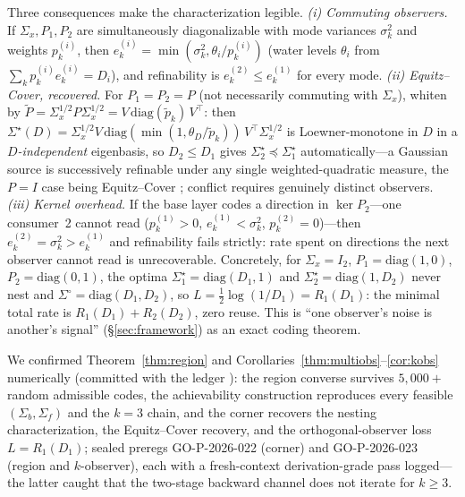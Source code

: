 \documentclass[lettersize,onecolumn]{IEEEtran}
\theoremstyle{definition}
\theoremstyle{remark}
\begin{document}
Three consequences make the characterization legible. \emph{(i) Commuting observers.} If
$\Sigma_x,P_1,P_2$ are simultaneously diagonalizable with mode variances $\sigma_k^2$
and weights $p_k^{(i)}$, then $e_k^{(i)}=\min(\sigma_k^2,\theta_i/p_k^{(i)})$ (water
levels $\theta_i$ from $\sum_k p_k^{(i)}e_k^{(i)}=D_i$), and refinability is $e_k^{(2)}
\le e_k^{(1)}$ for every mode. \emph{(ii) Equitz--Cover, recovered.} For $P_1=P_2=P$ (not
necessarily commuting with $\Sigma_x$), whiten by $\tilde P=\Sigma_x^{1/2}P
\Sigma_x^{1/2}=V\,\mathrm{diag}(\tilde p_k)\,V^\top$: then $\Sigma^\star(D)=
\Sigma_x^{1/2}V\,\mathrm{diag}(\min(1,\theta_D/\tilde p_k))\,V^\top\Sigma_x^{1/2}$ is
Loewner-monotone in $D$ in a \emph{$D$-independent} eigenbasis, so $D_2\le D_1$ gives
$\Sigma_2^\star\preceq\Sigma_1^\star$ automatically---a Gaussian source is successively
refinable under any single weighted-quadratic measure, the $P=I$ case being
Equitz--Cover \cite{equitzcover}; conflict requires genuinely distinct observers. \emph{(iii) Kernel overhead.} If the base layer codes a direction in
$\ker P_2$---one consumer~2 cannot read ($p_k^{(1)}>0$, $e_k^{(1)}<\sigma_k^2$,
$p_k^{(2)}=0$)---then $e_k^{(2)}=\sigma_k^2>e_k^{(1)}$ and refinability fails strictly:
rate spent on directions the next observer cannot read is unrecoverable. Concretely, for
$\Sigma_x=I_2$, $P_1=\mathrm{diag}(1,0)$, $P_2=\mathrm{diag}(0,1)$, the optima
$\Sigma_1^\star=\mathrm{diag}(D_1,1)$ and $\Sigma_2^\star=\mathrm{diag}(1,D_2)$ never
nest and $\Sigma^\circ=\mathrm{diag}(D_1,D_2)$, so $L=\tfrac12\log(1/D_1)=R_1(D_1)$: the
minimal total rate is $R_1(D_1)+R_2(D_2)$, zero reuse. This is ``one observer's noise is
another's signal'' (\S\ref{sec:framework}) as an exact coding theorem.

We confirmed Theorem~\ref{thm:region} and Corollaries~\ref{thm:multiobs}--\ref{cor:kobs}
numerically (committed with the ledger \cite{ledger2026}): the region converse survives
$5{,}000+$ random admissible codes, the achievability construction reproduces every
feasible $(\Sigma_b,\Sigma_f)$ and the $k=3$ chain, and the corner recovers the nesting
characterization, the Equitz--Cover recovery, and the orthogonal-observer loss
$L=R_1(D_1)$; sealed preregs GO-P-2026-022 (corner) and GO-P-2026-023 (region and
$k$-observer), each with a fresh-context derivation-grade pass logged---the latter caught
that the two-stage backward channel does not iterate for $k\ge3$.
\end{document}
